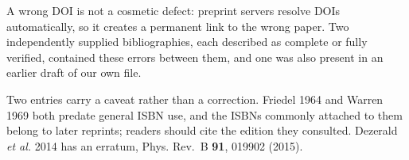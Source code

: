 A wrong DOI is not a cosmetic defect: preprint servers resolve DOIs
automatically, so it creates a permanent link to the wrong paper. Two
independently supplied bibliographies, each described as complete or fully
verified, contained these errors between them, and one was also present in an
earlier draft of our own file.

Two entries carry a caveat rather than a correction. Friedel 1964 and Warren
1969 both predate general ISBN use, and the ISBNs commonly attached to them
belong to later reprints; readers should cite the edition they consulted.
Dezerald \emph{et al.} 2014 has an erratum, Phys. Rev.~B \textbf{91}, 019902 (2015).
